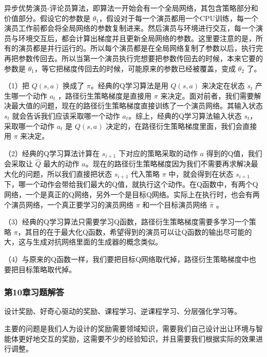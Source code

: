 
异步优势演员-评论员算法，即算法一开始会有一个全局网络，其包含策略部分和价值部分。假设它的参数是 $\theta_1$，假设对于每一个演员都用一个CPU训练，每一个演员工作前都会将全局网络的参数复制进来。然后演员与环境进行交互，每一个演员与环境交互后，都会计算出梯度并且更新全局网络的参数。这里要注意的是，所有的演员都是并行运行的。所以每个演员都是在全局网络复制了参数以后，执行完再把参数传回去。所以当第一个演员执行完想要把参数传回去的时候，本来它要的参数是 $\theta_1$，等它把梯度传回去的时候，可能原来的参数已经被覆盖，变成 $\theta_2$ 了。
  

（1）把 $Q(s,a)$ 换成了 $\pi$。经典的Q学习算法是用 $Q(s,a)$ 来决定在状态 $s_t$ 产生哪一个动作 $a_{t}$ ，路径衍生策略梯度是直接用 $\pi$ 来决定。面对前者，我们需要解决最大值的问题，现在的路径衍生策略梯度直接训练了一个演员网络。其输入状态 $s_t$ 就会告诉我们应该采取哪一个动作 $a_{t}$。综上，经典的Q学习算法输入状态 $s_t$，采取哪一个动作 $a_t$ 是 $Q(s,a)$ 决定的，在路径衍生策略梯度里面，我们会直接用 $\pi$ 来决定。

（2）经典的Q学习算法计算在 $s_{i+1}$ 下对应的策略采取的动作 $a$ 得到的Q值，我们会采取让 $\hat{Q}$ 最大的动作 $a$。现在的路径衍生策略梯度因为我们不需要再求解决最大化的问题，所以我们直接把状态 $s_{i+1}$ 代入策略 $\pi$ 中，就会得到在状态 $s_{i+1}$ 下，哪一个动作会带给我们最大的Q值，就执行这个动作。在Q函数中，有两个Q网络，一个是真正的Q网络，另外一个是目标Q网络。实际上在执行时，也会有两个演员网络，一个真正要学习的演员网络 $\pi$ 和一个目标演员网络 $\hat{\pi}$ 。

（3）经典的Q学习算法只需要学习Q函数，路径衍生策略梯度需要多学习一个策略 $\pi$，其目的在于最大化Q函数，希望得到的演员可以让Q函数的输出尽可能的大，这与生成对抗网络里面的生成器的概念类似。

（4）与原来的Q函数一样，我们要把目标Q网络取代掉，路径衍生策略梯度中也要把目标策略取代掉。



\subsubsection*{第10章习题解答}


设计奖励、好奇心驱动的奖励、课程学习、逆课程学习、分层强化学习等。


主要的问题是我们人为设计的奖励需要领域知识，需要我们自己设计出让环境与智能体更好地交互的奖励，这需要不少的经验知识，并且需要我们根据实际的效果进行调整。

